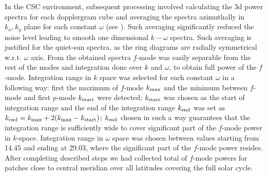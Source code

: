\documentclass{aa}
\begin{document}
In the CSC environment, subsequent processing involved calculating the 3d power spectra for each dopplergram cube and averaging the spectra azimuthally in $k_x, k_y$ plane for each constant $\omega$ (see ). Such averaging significantly reduced the noise level leading to smooth one dimensional $k-\omega$ spectra. Such averaging is justified for the quiet-sun spectra, as the ring diagrams are radially symmetrical w.r.t. $\omega$ axis. From the obtained spectra $f$-mode was easily separable from the rest of the modes and integration done over $k$ and $\omega$, to obtain full power of the $f$-mode. 
Integration range in $k$ space was selected for each constant $\omega$ in a following way: first the maximum of $f$-mode $k_{\rm max}$ and the minimum between $f$-mode and first $p$-mode $k_{\rm start}$ were detected; $k_{\rm start}$ was chosen as the start of integration range and the end of the integration range $k_{\rm end}$ was set as $k_{\rm end}=k_{\rm max}+2(k_{\rm max}-k_{\rm start})$; $k_{\rm end}$ chosen in such a way guarantees that the integration range is sufficiently wide to cover significant part of the $f$-mode power in $k$-space.
Integration range in $\omega$ space was chosen between values starting from 14.45 and ending at 29.03, where the significant part of the $f$-mode power resides. After completing described steps we had collected total of  $f$-mode powers for patches close to central meridian over all latitudes covering the full solar cycle.
\end{document}
